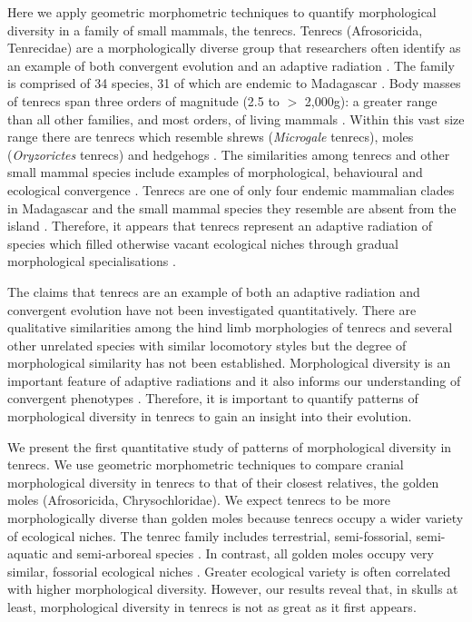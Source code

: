 \documentclass[12pt,a4paper]{article}
\begin{document}
	Here we apply geometric morphometric techniques to quantify morphological diversity in a family of small mammals, the tenrecs. Tenrecs (Afrosoricida, Tenrecidae) are a morphologically diverse group that researchers often identify as an example of both convergent evolution and an adaptive radiation \citep{Soarimalala2011, Eisenberg1969}. The family is comprised of 34 species, 31 of which are endemic to Madagascar \citep{Olson2013}. Body masses of tenrecs span three orders of magnitude (2.5 to $>$ 2,000g): a greater range than all other families, and most orders, of living mammals \citep{Olson2003}. Within this vast size range there are tenrecs which resemble shrews (\textit{Microgale} tenrecs), moles (\textit{Oryzorictes} tenrecs) and hedgehogs \citep[\textit{Echinops} and \textit{Setifer} tenrecs,][]{Eisenberg1969}. The similarities among tenrecs and other small mammal species include examples of morphological, behavioural and ecological convergence \citep{Soarimalala2011}. Tenrecs are one of only four endemic mammalian clades in Madagascar and the small mammal species they resemble are absent from the island \citep{Garbutt1999}. Therefore, it appears that tenrecs represent an adaptive radiation of species which filled otherwise vacant ecological niches through gradual morphological specialisations \citep{Poux2008}.
	
	The claims that tenrecs are an example of both an adaptive radiation and convergent evolution have not been investigated quantitatively. There are qualitative similarities among the hind limb morphologies of tenrecs and several other unrelated species with similar locomotory styles \citep{Salton2009} but the degree of morphological similarity has not been established. Morphological diversity is an important feature of adaptive radiations \citep{Losos2010a} and it also informs our understanding of convergent phenotypes \citep{Muschick2012}. Therefore, it is important to quantify patterns of morphological diversity in tenrecs to gain an insight into their evolution. 
	
	We present the first quantitative study of patterns of morphological diversity in tenrecs. We use geometric morphometric techniques \citep{Rohlf1993} to compare cranial morphological diversity in tenrecs to that of their closest relatives, the golden moles (Afrosoricida, Chrysochloridae). 
	We expect tenrecs to be more morphologically diverse than golden moles because tenrecs occupy a wider variety of ecological niches. The tenrec family includes terrestrial, semi-fossorial, semi-aquatic and semi-arboreal species \citep{Soarimalala2011}. In contrast, all golden moles occupy very similar, fossorial ecological niches \citep{Bronner1995}. Greater ecological variety is often \citep[though not always:][]{McGee2013, Losos2010a} correlated with higher morphological diversity. However, our results reveal that, in skulls at least, morphological diversity in tenrecs is not as great as it first appears.
	
\end{document}
